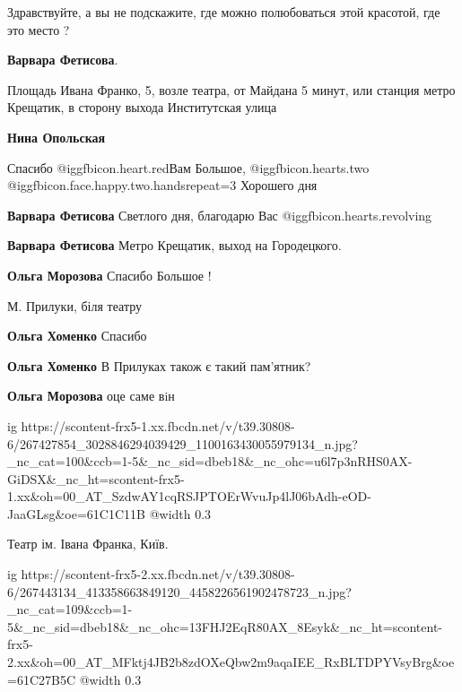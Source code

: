  
 
 
 
 


Здравствуйте, а вы не подскажите, где можно полюбоваться этой красотой, где это место ?

\textbf{Варвара Фетисова}. 

Площадь Ивана Франко, 5, возле театра, от Майдана 5 минут, или станция метро
Крещатик, в сторону выхода Институтская улица

\textbf{Нина Опольская} 

Спасибо @igg{fbicon.heart.red}Вам Большое, @igg{fbicon.hearts.two}
@igg{fbicon.face.happy.two.hands}{repeat=3} Хорошего дня

\textbf{Варвара Фетисова} Светлого дня, благодарю Вас @igg{fbicon.hearts.revolving} 

\textbf{Варвара Фетисова} Метро Крещатик, выход на Городецкого.

\textbf{Ольга Морозова} Спасибо Большое !

М. Прилуки, біля театру

\textbf{Ольга Хоменко} Спасибо

\textbf{Ольга Хоменко} В Прилуках також є такий пам'ятник?

\textbf{Ольга Морозова} оце саме вiн

\ifcmt
  ig https://scontent-frx5-1.xx.fbcdn.net/v/t39.30808-6/267427854_3028846294039429_1100163430055979134_n.jpg?_nc_cat=100&ccb=1-5&_nc_sid=dbeb18&_nc_ohc=u6l7p3nRHS0AX-GiDSX&_nc_ht=scontent-frx5-1.xx&oh=00_AT_SzdwAY1cqRSJPTOErWvuJp4lJ06bAdh-eOD-JaaGLsg&oe=61C1C11B
  @width 0.3
\fi

Театр ім. Івана Франка, Київ.

\ifcmt
  ig https://scontent-frx5-2.xx.fbcdn.net/v/t39.30808-6/267443134_413358663849120_4458226561902478723_n.jpg?_nc_cat=109&ccb=1-5&_nc_sid=dbeb18&_nc_ohc=13FHJ2EqR80AX_8Esyk&_nc_ht=scontent-frx5-2.xx&oh=00_AT_MFktj4JB2b8zdOXeQbw2m9aqaIEE_RxBLTDPYVsyBrg&oe=61C27B5C
  @width 0.3
\fi

